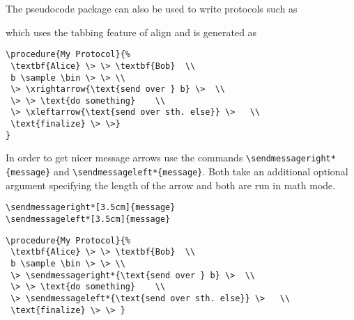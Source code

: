 \documentclass[a4paper]{report}
\begin{document}
The pseudocode package can also be used to write protocols such as
\begin{center}
\end{center}
which uses the tabbing feature of align and is generated as
\begin{lstlisting}
\procedure{My Protocol}{%
 \textbf{Alice} \> \> \textbf{Bob}  \\
 b \sample \bin \> \> \\
 \> \xrightarrow{\text{send over } b} \>  \\
 \> \> \text{do something}    \\
 \> \xleftarrow{\text{send over sth. else}} \>   \\
 \text{finalize} \> \>}
}
\end{lstlisting}

In order to get nicer message arrows use the commands \lstinline$\sendmessageright*{message}$ and \lstinline$\sendmessageleft*{message}$.
Both take an additional optional argument specifying the length of the arrow and both are run
in math mode.
\begin{lstlisting}
\sendmessageright*[3.5cm]{message}
\sendmessageleft*[3.5cm]{message}
\end{lstlisting}


\begin{center}
\end{center}
\begin{lstlisting}
\procedure{My Protocol}{%
 \textbf{Alice} \> \> \textbf{Bob}  \\
 b \sample \bin \> \> \\
 \> \sendmessageright*{\text{send over } b} \>  \\
 \> \> \text{do something}    \\
 \> \sendmessageleft*{\text{send over sth. else}} \>   \\
 \text{finalize} \> \> }
\end{lstlisting}
\end{document}
